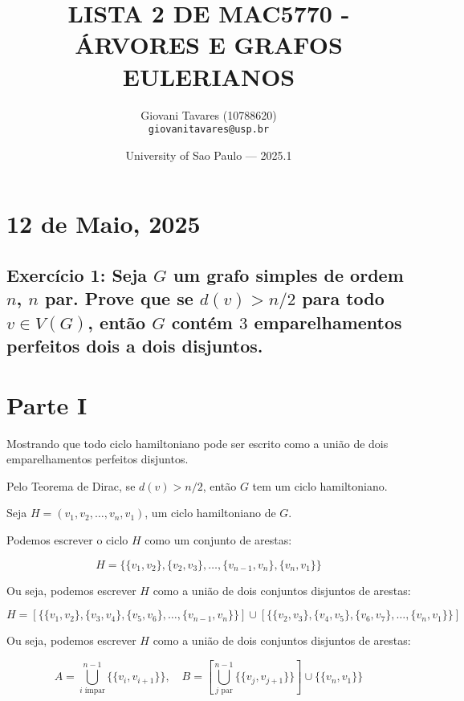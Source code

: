 \documentclass{article}
\title{LISTA 2 DE MAC5770 - ÁRVORES E GRAFOS EULERIANOS} %
\author{Giovani Tavares (10788620)\\ \texttt{giovanitavares@usp.br}} %
\date{University of Sao Paulo --- 2025.1} %
\begin{document}
\maketitle %


\section{12 de Maio, 2025} %


 \subsection{Exercício 1:  Seja $G$ um grafo simples de ordem $n$, $n$ par. Prove que se $d(v) > n/2$ para todo $v \in V (G)$, então $G$ contém $3$ emparelhamentos perfeitos dois a dois disjuntos.}
 
 \section*{Parte I}
 
 Mostrando que todo ciclo hamiltoniano pode ser escrito como a união de dois emparelhamentos perfeitos disjuntos.
 
 Pelo Teorema de Dirac, se $d(v) > n/2$, então $G$ tem um ciclo hamiltoniano.
 
 Seja $H = (v_1, v_2, \ldots, v_n, v_1)$, um ciclo hamiltoniano de $G$.
 
 Podemos escrever o ciclo $H$ como um conjunto de arestas:
 
 $$
 H = \{ \{v_1, v_2\}, \{v_2, v_3\}, \ldots, \{v_{n-1}, v_n\}, \{v_n, v_1\} \}
 $$
 
 Ou seja, podemos escrever $H$ como a união de dois conjuntos disjuntos de arestas:
 
 $$
 H = \left[ \{ \{v_1, v_2\}, \{v_3, v_4\}, \{v_5, v_6\}, \ldots, \{v_{n-1}, v_n\} \} \right] \cup
 \left[ \{ \{v_2, v_3\}, \{v_4, v_5\}, \{v_6, v_7\}, \ldots, \{v_n, v_1\} \} \right]
 $$
 
 Ou seja, podemos escrever $H$ como a união de dois conjuntos disjuntos de arestas:
 
 $$
 A = \bigcup_{i \text{ ímpar}}^{n-1} \{ \{v_i, v_{i+1}\} \}, \quad 
 B = [\bigcup_{j \text{ par}}^{n-1} \{ \{v_j, v_{j+1}\} \}] \cup \{ \{v_n, v_1\} \}
 $$
 
\end{document}
